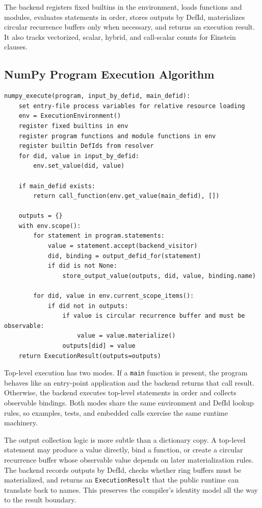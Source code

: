 The backend registers fixed builtins in the environment, loads functions and
modules, evaluates statements in order, stores outputs by DefId, materializes
circular recurrence buffers only when necessary, and returns an execution
result. It also tracks vectorized, scalar, hybrid, and call-scalar counts for
Einstein clauses.

\subsection{NumPy Program Execution Algorithm}

\begin{lstlisting}[style=pythoncode,caption={NumPy backend top-level execution.}]
numpy_execute(program, input_by_defid, main_defid):
    set entry-file process variables for relative resource loading
    env = ExecutionEnvironment()
    register fixed builtins in env
    register program functions and module functions in env
    register builtin DefIds from resolver
    for did, value in input_by_defid:
        env.set_value(did, value)

    if main_defid exists:
        return call_function(env.get_value(main_defid), [])

    outputs = {}
    with env.scope():
        for statement in program.statements:
            value = statement.accept(backend_visitor)
            did, binding = output_defid_for(statement)
            if did is not None:
                store_output_value(outputs, did, value, binding.name)

        for did, value in env.current_scope_items():
            if did not in outputs:
                if value is circular recurrence buffer and must be observable:
                    value = value.materialize()
                outputs[did] = value
    return ExecutionResult(outputs=outputs)
\end{lstlisting}

Top-level execution has two modes. If a \texttt{main} function is present, the
program behaves like an entry-point application and the backend returns that
call result. Otherwise, the backend executes top-level statements in order and
collects observable bindings. Both modes share the same environment and DefId
lookup rules, so examples, tests, and embedded calls exercise the same runtime
machinery.

The output collection logic is more subtle than a dictionary copy. A top-level
statement may produce a value directly, bind a function, or create a circular
recurrence buffer whose observable value depends on later materialization
rules. The backend records outputs by DefId, checks whether ring buffers must
be materialized, and returns an \texttt{ExecutionResult} that the public runtime
can translate back to names. This preserves the compiler's identity model all
the way to the result boundary.


